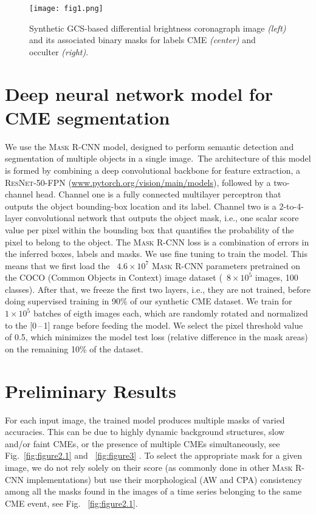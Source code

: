 \documentclass[baaa]{baaa}
\begin{document}
\begin{figure*}[!ht]
  \centering
  \texttt{[image: fig1.png]}
  \caption{Synthetic GCS-based differential brightness coronagraph image \emph{(left)} and its associated binary masks for labels CME \emph{(center)} and occulter \emph{(right)}.}
  \label{fig:figure1}
\end{figure*}

\section{Deep neural network model for CME segmentation}
We use the \textsc{Mask R-CNN}  \citep{He2017} model, designed to perform semantic detection and segmentation of multiple objects in a single image. The architecture of this model is formed by combining a deep convolutional backbone for feature extraction, a \textsc{ResNet-50-FPN} (\url{www.pytorch.org/vision/main/models}), followed by a two-channel head. Channel one is a fully connected multilayer perceptron that outputs the object bounding-box location and its label. Channel two is a 2-to-4-layer convolutional network that outputs the object mask, i.e., one scalar score value per pixel within the bounding box that quantifies the probability of the pixel to belong to the object. The \textsc{Mask R-CNN} loss is a combination of errors in the inferred boxes, labels and masks.
We use fine tuning to train the model. This means that we first load the ~$4.6\times10^7$ \textsc{Mask R-CNN} parameters pretrained on the COCO (Common Objects in Context) image dataset (~$8\times10^5$ images, 100 classes). After that, we freeze the first two layers, i.e., they are not trained, before doing supervised training in 90\% of our synthetic CME dataset. We train for ~$1\times10^5$ batches of eigth images each, which are randomly rotated and normalized to the [0\,--\,1] range before feeding the model. We select the pixel threshold value of 0.5, which minimizes the model test loss (relative difference in the mask areas) on the remaining 10\% of the dataset.

\section{Preliminary Results}
For each input image, the trained model produces multiple masks of varied accuracies. This can be due to highly dynamic background structures, slow and/or faint CMEs, or the presence of multiple CMEs simultaneously, see Fig.~\ref{fig:figure2.1} and ~\ref{fig:figure3} . To select the appropriate mask for a given image, we do not rely solely on their score (as commonly done in other \textsc{Mask R-CNN} implementations) but use their morphological (AW and CPA) consistency among all the masks found in the images of a time series belonging to the same CME event, see Fig. ~\ref{fig:figure2.1}.
\end{document}
